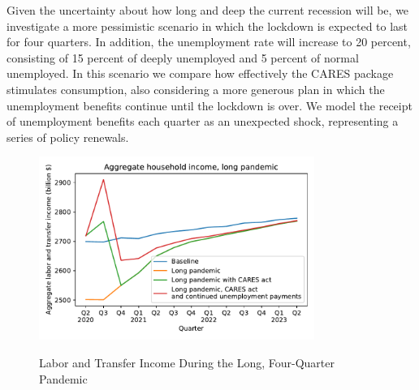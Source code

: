 \documentclass[titlepage,a4paper]{\econtex}
\begin{document}
Given the uncertainty about how long and deep the current recession will be, we investigate a more pessimistic scenario in which the lockdown is expected to last for four quarters.
In addition, the unemployment rate will increase to 20 percent, consisting of 15 percent of deeply unemployed and 5 percent of normal unemployed.
In this scenario we compare how effectively the CARES package stimulates consumption, also considering a more generous plan in which the unemployment benefits continue until the lockdown is over.
We model the receipt of unemployment benefits each quarter as an unexpected shock, representing a series of policy renewals.

\begin{figure}
  \centering
  \caption{Labor and Transfer Income During the Long, Four-Quarter Pandemic}
  \label{inc_response_pandemic}
  { \includegraphics[width=0.8\textwidth]{./Figures/AggLT_long_pandemic}}
\end{figure}
\end{document}
